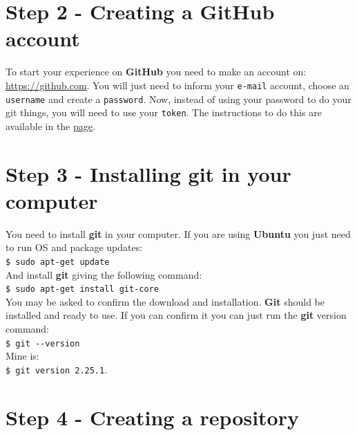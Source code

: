 \documentclass[12pt,a4paper,titlepage,brazil]{article}
\begin{document}

\section{Step 2 - Creating a GitHub account}

To start your experience on {\bf GitHub} you need to make an account on:
\url{https://github.com}. You will just need to inform your \texttt{e-mail} account, choose an \texttt{username} and create a \texttt{password}. Now, instead of using your password to do your git things, you will need to use your \texttt{token}. The instructions to do this are available in the \href{https://docs.github.com/en/github/authenticating-to-github/creating-a-personal-access-token}{page}.


\section{Step 3 - Installing git in your computer}

You need to install {\bf git} in your computer. If you are using {\bf Ubuntu} you just need to run OS and package updates:\\

\texttt{\$ sudo apt-get update}\\

And install {\bf git} giving the following command:\\

\texttt{\$ sudo apt-get install git-core}\\

You may be asked to confirm the download and installation. {\bf Git} should be installed and ready to use. If you can confirm it you can just run the {\bf git} version command:\\

\texttt{\$ git -\hspace{0.01cm}-version}\\

Mine is:\\

\texttt{\$ git version 2.25.1}.


\section{Step 4 - Creating a repository}
\end{document}
